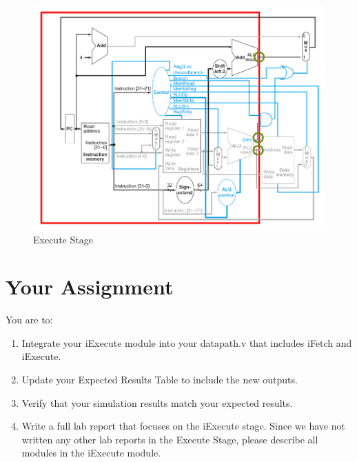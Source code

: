 \begin{figure}
	\caption{Execute Stage}\label{fig:integrated_execute}
	\begin{center}
		\includegraphics[width=4.75in]{../images/integrated_execute.png}
	\end{center}
\end{figure} 

\section{Your Assignment}

You are to:
\begin{enumerate}
\item Integrate your iExecute module into your datapath.v that includes iFetch and iExecute.
\item Update your Expected Results Table to include the new outputs.
\item Verify that your simulation results match your expected results.
\item Write a full lab report that focuses on the iExecute stage.  Since we have not written any other lab reports in the Execute Stage, please describe all modules in the iExecute module.
\end{enumerate}